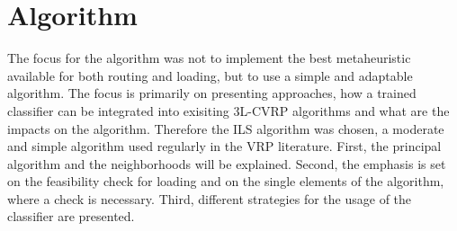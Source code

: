 \chapter{Algorithm}
\label{chap:algorithm}
The focus for the algorithm was not to implement the best metaheuristic available for both routing and loading, but
to use a simple and adaptable algorithm. The focus is primarily on presenting approaches, how a trained classifier can
be integrated into exisiting \gls{3L-CVRP} algorithms and what are the impacts on the algorithm. Therefore the \Gls{ILS}
algorithm was chosen, a moderate and simple algorithm used regularly in the \gls{VRP} literature. First, the principal
algorithm and the neighborhoods will be explained. Second, the emphasis is set on the feasibility check for loading and
on the single elements of the algorithm, where a check is necessary. Third, different strategies for the usage of the
classifier are presented.

